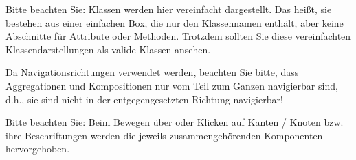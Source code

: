 Bitte beachten Sie: Klassen werden hier vereinfacht dargestellt. 
 Das heißt, sie bestehen aus einer einfachen Box, die nur den Klassennamen enthält, aber keine Abschnitte für Attribute oder Methoden. 
 Trotzdem sollten Sie diese vereinfachten Klassendarstellungen als valide Klassen ansehen.

Da Navigationsrichtungen verwendet werden, beachten Sie bitte, dass Aggregationen und Kompositionen nur vom \glqq{}Teil\grqq{} zum \glqq{}Ganzen\grqq{} navigierbar sind, d.h., sie sind nicht in der entgegengesetzten Richtung navigierbar!

Bitte beachten Sie: Beim Bewegen über oder Klicken auf Kanten / Knoten bzw. ihre Beschriftungen werden die jeweils zusammengehörenden Komponenten hervorgehoben.


